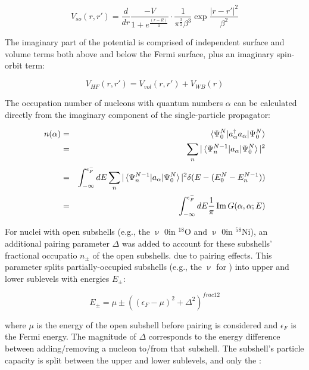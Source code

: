 \begin{equation}
    V_{so}(r,r') =
    \frac{d}{dr} \frac{-V}{1+e^{\frac{(r-R)}{a}}}\cdot\frac{1}{\pi^{\frac{3}{2}}\beta^{3}} \exp{\frac{|r-r'|^{2}}{\beta^{2}}}
\end{equation}

The imaginary part of the potential is comprised of independent surface and volume terms
both above and below the Fermi surface, plus an imaginary spin-orbit term:

\begin{equation}
    V_{HF}(r,r') = V_{vol}(r,r') + V_{WB}(r)
\end{equation}

The occupation number of nucleons with quantum numbers $\alpha$ can be
calculated directly from the imaginary component of the single-particle
propagator:

\begin{eqnarray}
    n(\alpha)
    & = & \braket{\Psi^{N}_{0}|a^{\dagger}_{\alpha}a_{\alpha}|\Psi^{N}_{0}}\\
    & = & \sum_{n}|\braket{\Psi^{N-1}_{n}|a_{\alpha}|\Psi^{N}_{0}}|^{2}\\
    & = & \int_{-\infty}^{\epsilon_{F}^{-}} dE
\sum_{n}|\braket{\Psi^{N-1}_{n}|a_{\alpha}|\Psi^{N}_{0}}|^{2}
\delta(E-(E^{N}_{0}-E^{N-1}_{n}))\\
& = & \int_{-\infty}^{\epsilon_{F}^{-}} dE \frac{1}{\pi}\operatorname{Im}G(\alpha,\alpha;E)
\end{eqnarray}



For nuclei with open subshells (e.g., the $\upnu$ 0\dFive in $^{18}$O and
$\upnu$ 0\fFive in $^{58}$Ni), an additional
pairing parameter $\Delta$ was added to
account for these subshells' fractional occupatio $n_{\pm}$ of the open subshells. due to pairing
effects. This parameter splits partially-occupied subshells (e.g., the $\upnu$\dFive
for \oEight) into upper and lower sublevels with energies $E_{\pm}$:

\begin{equation}
    E_{\pm} = \mu \pm ((\epsilon_{F}-\mu)^{2} + \Delta^{2})^{frac{1}{2}}
\end{equation}

where $\mu$ is the energy of the open subshell before pairing is considered and
$\epsilon_{F}$ is the Fermi
energy. The magnitude of $\Delta$ corresponds to the energy difference between
adding/removing a nucleon to/from that subshell. The subshell's particle
capacity is split between the upper and lower sublevels, and only the :

